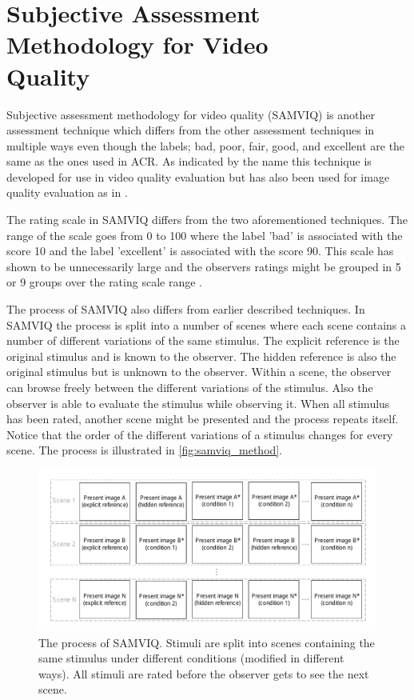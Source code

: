 
\section{Subjective Assessment Methodology for Video \\Quality} %
\label{sec:samviq}

Subjective assessment methodology for video quality (SAMVIQ) is another assessment technique which differs from the other assessment techniques in multiple ways even though the labels; bad, poor, fair, good, and excellent are the same as the ones used in ACR. As indicated by the name this technique is developed for use in video quality evaluation but has also been used for image quality evaluation as in \cite{Rouse2010}.

The rating scale in SAMVIQ differs from the two aforementioned techniques. The range of the scale goes from 0 to 100 where the label 'bad' is associated with the score 10 and the label 'excellent' is associated with the score 90. This scale has shown to be unnecessarily large and the observers ratings might be grouped in 5 or 9 groups over the rating scale range \cite{Rouse2010}.

The process of SAMVIQ also differs from earlier described techniques. In SAMVIQ the process is split into a number of scenes where each scene contains a number of different variations of the same stimulus. The explicit reference is the original stimulus and is known to the observer. The hidden reference is also the original stimulus but is unknown to the observer. Within a scene, the observer can browse freely between the different variations of the stimulus. Also the observer is able to evaluate the stimulus while observing it. When all stimulus has been rated, another scene might be presented and the process repeats itself. Notice that the order of the different variations of a stimulus changes for every scene. The process is illustrated in \autoref{fig:samviq_method}.

\begin{figure}[H]
	\centering
	\includegraphics[width = \columnwidth]{Img/SAMVIQ.pdf}
	\caption{The process of SAMVIQ. Stimuli are split into scenes containing the same stimulus under different conditions (modified in different ways). All stimuli are rated before the observer gets to see the next scene.}
	\label{fig:samviq_method}
\end{figure}

